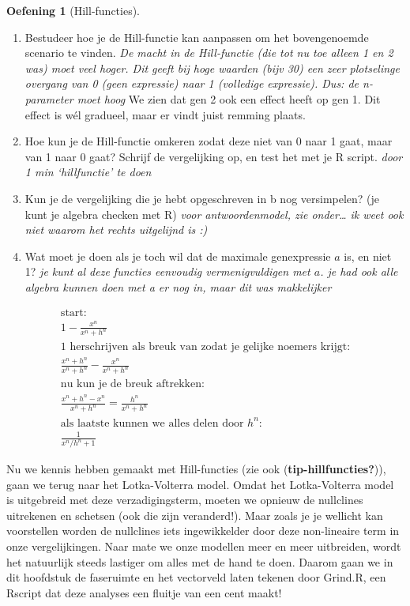 \documentclass[
  a4paper,
]{scrbook}
\providecommand{\tightlist}{%
  \setlength{\itemsep}{0pt}\setlength{\parskip}{0pt}}\usepackage{longtable,booktabs,array}
\theoremstyle{definition}
\newtheorem{exercise}{Oefening}[chapter]
\theoremstyle{remark}
\begin{document}
\begin{exercise}[Hill-functies]
\begin{enumerate}
\def\labelenumi{\alph{enumi}.}
\tightlist
\item
  Bestudeer hoe je de Hill-functie kan aanpassen om het bovengenoemde
  scenario te vinden. \emph{De macht in de Hill-functie (die tot nu toe
  alleen 1 en 2 was) moet veel hoger. Dit geeft bij hoge waarden (bijv
  30) een zeer plotselinge overgang van 0 (geen expressie) naar 1
  (volledige expressie). Dus: de n-parameter moet hoog} We zien dat gen
  2 ook een effect heeft op gen 1. Dit effect is wél gradueel, maar er
  vindt juist remming plaats.
\item
  Hoe kun je de Hill-functie omkeren zodat deze niet van 0 naar 1 gaat,
  maar van 1 naar 0 gaat? Schrijf de vergelijking op, en test het met je
  R script. \emph{door 1 min `hillfunctie' te doen}
\item
  Kun je de vergelijking die je hebt opgeschreven in b nog versimpelen?
  (je kunt je algebra checken met R) \emph{voor antwoordenmodel, zie
  onder\ldots{} ik weet ook niet waarom het rechts uitgelijnd is :)}
\item
  Wat moet je doen als je toch wil dat de maximale genexpressie \(a\)
  is, en niet 1? \emph{je kunt al deze functies eenvoudig
  vermenigvuldigen met \(a\). je had ook alle algebra kunnen doen met a
  er nog in, maar dit was makkelijker}
\end{enumerate}

\begin{align}
&\text{start:}\\
&1-\frac{x^n}{x^n+h^n} \\
&\text{1 herschrijven als breuk van zodat je gelijke noemers krijgt:} \\
&\frac{x^n+h^n}{x^n+h^n} - \frac{x^n}{x^n+h^n} \\
&\text{nu kun je de breuk aftrekken:} \\
& \frac{x^n+h^n-x^n}{x^n+h^n} = \frac{h^n}{x^n+h^n} \\
& \text{als laatste kunnen we alles delen door $h^n$:} \\
& \frac{1}{x^n/h^n+1}
& \end{align}

\end{exercise}

Nu we kennis hebben gemaakt met Hill-functies (zie ook
(\textbf{tip-hillfuncties?})), gaan we terug naar het Lotka-Volterra
model. Omdat het Lotka-Volterra model is uitgebreid met deze
verzadigingsterm, moeten we opnieuw de nullclines uitrekenen en schetsen
(ook die zijn veranderd!). Maar zoals je je wellicht kan voorstellen
worden de nullclines iets ingewikkelder door deze non-lineaire term in
onze vergelijkingen. Naar mate we onze modellen meer en meer uitbreiden,
wordt het natuurlijk steeds lastiger om alles met de hand te doen.
Daarom gaan we in dit hoofdstuk de faseruimte en het vectorveld laten
tekenen door Grind.R, een Rscript dat deze analyses een fluitje van een
cent maakt!
\end{document}
